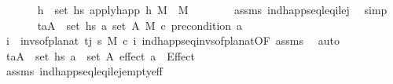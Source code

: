 \begin{isabellebody}
\ \ \ \ \isamarkupfalse%
\ {}{\isacharcolon}{\kern0pt}\ {\isachardoublequoteopen}{\isasymforall}h\ {\isasymin}\ set\ {\isacharquery}{\kern0pt}hs{\isacharprime}{\kern0pt}{\isachardot}{\kern0pt}\ apply{\isacharunderscore}{\kern0pt}happ\ h\ M\ {\isacharequal}{\kern0pt}\ M{\isachardoublequoteclose}\isanewline
\ \ \ \ \ \ \isamarkupfalse%
\ assms\ ind{\isacharunderscore}{\kern0pt}happ{\isacharunderscore}{\kern0pt}seq{\isacharunderscore}{\kern0pt}leq\isactrlsub i{\isacharunderscore}{\kern0pt}le\isactrlsub j\ \isamarkupfalse%
\ simp\isanewline
\ \ \ \ \isamarkupfalse%
\ {}{\isacharcolon}{\kern0pt}\ {\isachardoublequoteopen}{\isasymforall}{\isacharparenleft}{\kern0pt}t\isactrlsub a{\isacharcomma}{\kern0pt}A{\isacharparenright}{\kern0pt}\ {\isasymin}\ set\ {\isacharquery}{\kern0pt}hs{\isacharprime}{\kern0pt}{\isachardot}{\kern0pt}\ {\isasymforall}a{\isasymin}\ set\ A{\isachardot}{\kern0pt}\ M\ \isactrlsup c{\isasymTTurnstile}\isactrlsub {\isacharequal}{\kern0pt}\ precondition\ a{\isachardoublequoteclose}\isanewline
\ \ \ \ \ \ \isamarkupfalse%
\ {\isacartoucheopen}{\isasymforall}i\ {\isasymin}\ invs{\isacharunderscore}{\kern0pt}of{\isacharunderscore}{\kern0pt}plan{\isacharunderscore}{\kern0pt}at\ t\isactrlsub j\ {\isasympi}s{\isachardot}{\kern0pt}\ M\ \isactrlsup c{\isasymTTurnstile}\isactrlsub {\isacharequal}{\kern0pt}\ i{\isacartoucheclose}\ ind{\isacharunderscore}{\kern0pt}happ{\isacharunderscore}{\kern0pt}seq{\isacharunderscore}{\kern0pt}invs{\isacharunderscore}{\kern0pt}of{\isacharunderscore}{\kern0pt}plan{\isacharunderscore}{\kern0pt}at{\isacharbrackleft}{\kern0pt}OF\ assms{\isacharbrackright}{\kern0pt}\ \isamarkupfalse%
\ auto\isanewline
\ \ \ \ \isamarkupfalse%
\ {\isachardoublequoteopen}{\isasymforall}{\isacharparenleft}{\kern0pt}t\isactrlsub a{\isacharcomma}{\kern0pt}A{\isacharparenright}{\kern0pt}\ {\isasymin}\ set\ {\isacharquery}{\kern0pt}hs{\isacharprime}{\kern0pt}{\isachardot}{\kern0pt}\ {\isasymforall}a\ {\isasymin}\ set\ A{\isachardot}{\kern0pt}\ effect\ a\ {\isacharequal}{\kern0pt}\ Effect\ {\isacharbrackleft}{\kern0pt}{\isacharbrackright}{\kern0pt}\ {\isacharbrackleft}{\kern0pt}{\isacharbrackright}{\kern0pt}{\isachardoublequoteclose}\isanewline
\ \ \ \ \ \ \isamarkupfalse%
\ assms\ ind{\isacharunderscore}{\kern0pt}happ{\isacharunderscore}{\kern0pt}seq{\isacharunderscore}{\kern0pt}leq\isactrlsub i{\isacharunderscore}{\kern0pt}le\isactrlsub j{\isacharunderscore}{\kern0pt}empty{\isacharunderscore}{\kern0pt}eff\ \isamarkupfalse%

\end{isabellebody}
